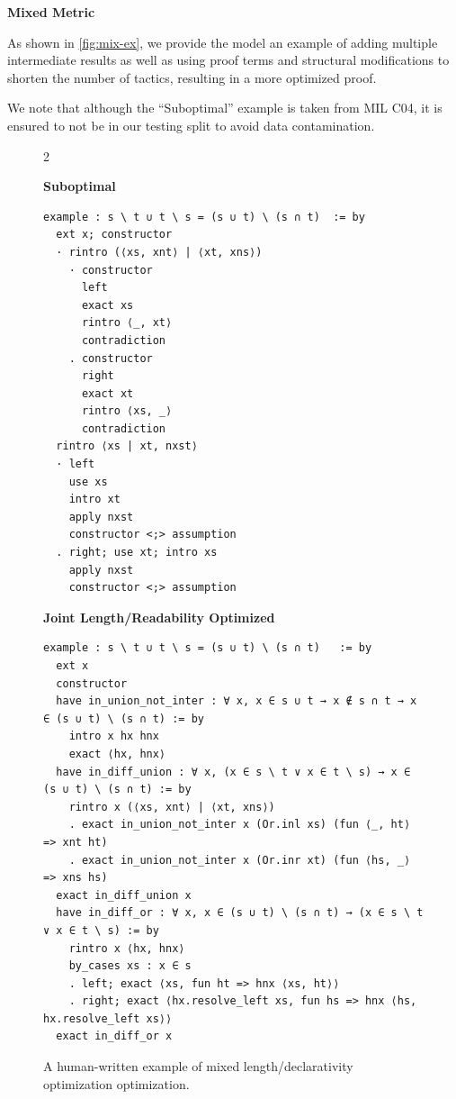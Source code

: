 \textbf{Mixed Metric}

As shown in \autoref{fig:mix-ex}, we provide the model an example of adding multiple intermediate results as well as using proof terms and structural modifications to shorten the number of tactics, resulting in a more optimized proof.

We note that although the ``Suboptimal'' example is taken from MIL C04, it is ensured to not be in our testing split to avoid data contamination.
\setlength{\columnsep}{0.2cm}
\begin{figure}[ht]
\begin{multicols}{2}

{
\textbf{Suboptimal}
\begin{scriptsize}
\begin{lstlisting}[basicstyle=\scriptsize\ttfamily]
example : s \ t ∪ t \ s = (s ∪ t) \ (s ∩ t)  := by
  ext x; constructor
  · rintro (⟨xs, xnt⟩ | ⟨xt, xns⟩)
    · constructor
      left
      exact xs
      rintro ⟨_, xt⟩
      contradiction
    . constructor
      right
      exact xt
      rintro ⟨xs, _⟩
      contradiction
  rintro ⟨xs | xt, nxst⟩
  · left
    use xs
    intro xt
    apply nxst
    constructor <;> assumption
  . right; use xt; intro xs
    apply nxst
    constructor <;> assumption
\end{lstlisting}
\end{scriptsize}
}
\vfill\null
\columnbreak
{
\textbf{Joint Length/Readability Optimized}
\begin{scriptsize}
\begin{lstlisting}[basicstyle=\scriptsize\ttfamily]
example : s \ t ∪ t \ s = (s ∪ t) \ (s ∩ t)   := by
  ext x
  constructor
  have in_union_not_inter : ∀ x, x ∈ s ∪ t → x ∉ s ∩ t → x ∈ (s ∪ t) \ (s ∩ t) := by
    intro x hx hnx
    exact ⟨hx, hnx⟩
  have in_diff_union : ∀ x, (x ∈ s \ t ∨ x ∈ t \ s) → x ∈ (s ∪ t) \ (s ∩ t) := by
    rintro x (⟨xs, xnt⟩ | ⟨xt, xns⟩)
    . exact in_union_not_inter x (Or.inl xs) (fun ⟨_, ht⟩ => xnt ht)
    . exact in_union_not_inter x (Or.inr xt) (fun ⟨hs, _⟩ => xns hs)
  exact in_diff_union x
  have in_diff_or : ∀ x, x ∈ (s ∪ t) \ (s ∩ t) → (x ∈ s \ t ∨ x ∈ t \ s) := by
    rintro x ⟨hx, hnx⟩
    by_cases xs : x ∈ s
    . left; exact ⟨xs, fun ht => hnx ⟨xs, ht⟩⟩
    . right; exact ⟨hx.resolve_left xs, fun hs => hnx ⟨hs, hx.resolve_left xs⟩⟩
  exact in_diff_or x
\end{lstlisting}
\end{scriptsize}
}
\end{multicols}
\vspace{-2.5em}
\caption{A human-written example of mixed length/declarativity optimization optimization.}
\label{fig:mix-ex}
\end{figure}








